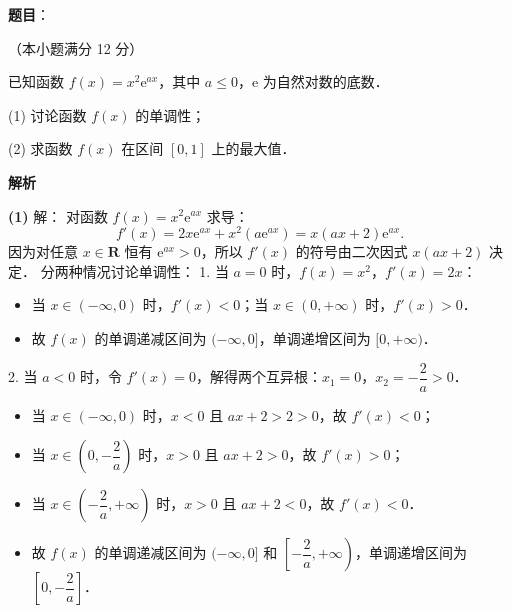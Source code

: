 \begin{answer}

\textbf{题目}：

（本小题满分 12 分）

已知函数 $f(x) = x^2 \mathrm{e}^{ax}$，其中 $a \leqslant 0$，$\mathrm{e}$ 为自然对数的底数．

(1) 讨论函数 $f(x)$ 的单调性；

(2) 求函数 $f(x)$ 在区间 $[0, 1]$ 上的最大值．

\textbf{解析}

\textbf{(1)} 解：
对函数 $f(x) = x^2 \mathrm{e}^{ax}$ 求导：
\nopagebreak[4]
\[
f'(x) = 2x \mathrm{e}^{ax} + x^2 (a\mathrm{e}^{ax}) = x(ax + 2)\mathrm{e}^{ax}.
\]
因为对任意 $x \in \mathbf{R}$ 恒有 $\mathrm{e}^{ax} > 0$，所以 $f'(x)$ 的符号由二次因式 $x(ax + 2)$ 决定．
分两种情况讨论单调性：
1. 当 $a = 0$ 时，$f(x) = x^2$，$f'(x) = 2x$：
\begin{itemize}
\item 当 $x \in (-\infty, 0)$ 时，$f'(x) < 0$；当 $x \in (0, +\infty)$ 时，$f'(x) > 0$．
\item 故 $f(x)$ 的单调递减区间为 $(-\infty, 0]$，单调递增区间为 $[0, +\infty)$．
\end{itemize}
2. 当 $a < 0$ 时，令 $f'(x) = 0$，解得两个互异根：$x_1 = 0$，$x_2 = -\dfrac{2}{a} > 0$．
\begin{itemize}
\item 当 $x \in (-\infty, 0)$ 时，$x < 0$ 且 $ax + 2 > 2 > 0$，故 $f'(x) < 0$；
\item 当 $x \in \left(0, -\dfrac{2}{a}\right)$ 时，$x > 0$ 且 $ax + 2 > 0$，故 $f'(x) > 0$；
\item 当 $x \in \left(-\dfrac{2}{a}, +\infty\right)$ 时，$x > 0$ 且 $ax + 2 < 0$，故 $f'(x) < 0$．
\item 故 $f(x)$ 的单调递减区间为 $(-\infty, 0]$ 和 $\left[-\dfrac{2}{a}, +\infty\right)$，单调递增区间为 $\left[0, -\dfrac{2}{a}\right]$．
\end{itemize}


\end{answer}
